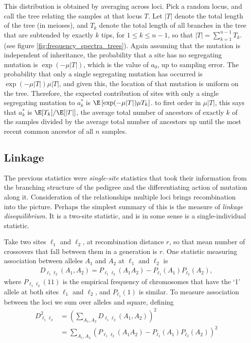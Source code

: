 This distribution is obtained by averaging across loci.
Pick a random locus, and call the tree relating the samples at that locus $T$.
Let $|T|$ denote the total length of the tree (in meioses),
and $T_k$ denote the total length of all branches in the tree that are subtended by exactly $k$ tips,
for $1 \le k \le n-1$, so that $|T| = \sum_{k=1}^{n-1} T_k$.
(see figure \ref{fig:frequency_spectra_trees}).
Again assuming that the mutation is independent of inheritance,
the probability that a site has no segregating mutation is
$\exp(-\mu |T|)$, which is the value of $a_0$, up to sampling error.
The probability that only a single segregating mutation has occurred is $\exp(-\mu |T|) \mu |T|$,
and given this,
the location of that mutation is uniform on the tree.
Therefore, the expected contribution of sites with only a single segregating mutation
to $a_k^*$ is $\E\left[ \exp(-\mu |T|) \mu T_k \right]$.
to first order in $\mu |T|$, this says that $a_k^*$ is $\E[T_k]/\E[|T|]$,
the average total number of ancestors of exactly $k$ of the samples
divided by the average total number of ancestors up until the most recent common ancestor of all $n$ samples.



\subsection{Linkage}

The previous statistics were \emph{single-site} statistics
that took their information from the branching structure of the pedigree
and the differentiating action of mutation along it.
Consideration of the relationships multiple loci brings recombination into the picture.
Perhaps the simplest summary of this is the measure of \emph{linkage disequilibrium}.
It is a two-site statistic, and is in some sense is a single-individual statistic.

Take two sites $\ell_1$ and $\ell_2$, at recombination distance $r$,
so that mean number of crossovers that fall between them in a generation is $r$.
One statistic measuring association between alleles $A_1$ and $A_2$ at $\ell_1$ and $\ell_2$ is
\begin{align}
  D_{\ell_1 \ell_2}(A_1,A_2) = P_{\ell_1 \ell_2}(A_1 A_2) - P_{\ell_1}(A_1) P_{\ell_2}(A_2) ,
\end{align}
where $P_{\ell_1 \ell_2}(11)$ is the empirical frequency of chromosomes that have the `1' allele at both sites $\ell_1$ and $\ell_2$,
and $P_{\ell_1}(1)$ is similar.
To measure association between the loci we sum over alleles and square, defining
\begin{align}
  D_{\ell_1 \ell_2}^2 &= \left( \sum_{A_1,A_2} D_{\ell_1 \ell_2}(A_1,A_2) \right)^2 \\
    &= \sum_{A_1,A_2} \left( P_{\ell_1 \ell_2}(A_1 A_2) - P_{\ell_1}(A_1) P_{\ell_2}(A_2) \right)^2
\end{align}

